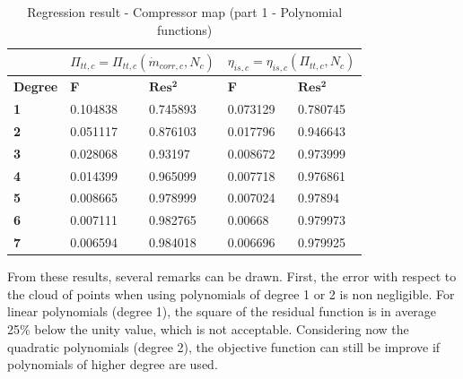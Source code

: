 \begin{longtable}[c]{@{}lll|ll@{}}
\caption{Regression result - Compressor map (part 1 - Polynomial functions)}
\label{tab:C7_regcomp}\\
\toprule
                & \multicolumn{2}{l|}{$\Pi_{tt,c} = \Pi_{tt,c}(\dot{m}_{corr,c},N_c)$} & \multicolumn{2}{l}{$\eta_{is,c} = \eta_{is,c}(\Pi_{tt,c},N_c)$} \\* \midrule
\endfirsthead
%
\endhead
%
\bottomrule
\endfoot
%
\endlastfoot
%
\textbf{Degree} & \textbf{F}                     & $\mathbf{Res^2}$                    & \textbf{F}                  & $\mathbf{Res^2}$                  \\
\textbf{1}      & 0.104838                       & 0.745893                            & 0.073129                    & 0.780745                          \\
\textbf{2}      & 0.051117                       & 0.876103                            & 0.017796                    & 0.946643                          \\
\textbf{3}      & 0.028068                       & 0.93197                             & 0.008672                    & 0.973999                          \\
\textbf{4}      & 0.014399                       & 0.965099                            & 0.007718                    & 0.976861                          \\
\textbf{5}      & 0.008665                       & 0.978999                            & 0.007024                    & 0.97894                           \\
\textbf{6}      & 0.007111                       & 0.982765                            & 0.00668                     & 0.979973                          \\
\textbf{7}      & 0.006594                       & 0.984018                            & 0.006696                    & 0.979925                          \\* \bottomrule
\end{longtable}

From these results, several remarks can be drawn. First, the error with respect to the cloud of points when using polynomials of degree 1 or 2 is non negligible. For linear polynomials (degree 1), the square of the residual function is in average 25\% below the unity value, which is not acceptable. Considering now the quadratic polynomials (degree 2), the objective function can still be improve if polynomials of higher degree are used.

